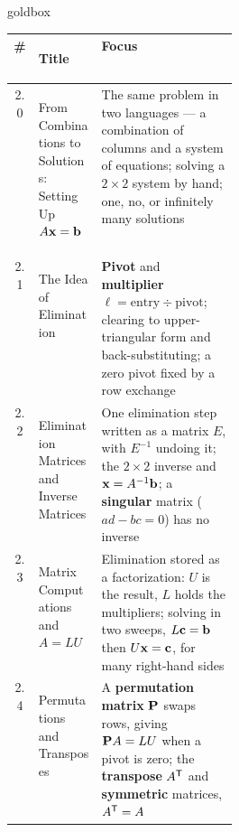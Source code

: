 \vspace{0.13in}

\renewcommand{\arraystretch}{1.32}
\begin{skillbox}{goldbox}
\begin{tabularx}{\linewidth}{@{} c >{\bfseries\raggedright\arraybackslash}p{0.29\linewidth} X @{}}
  \textbf{\#} & \textbf{Title} & \textbf{Focus} \\
  \hline
  2.0 & From Combinations to Solutions: Setting Up $A\mathbf{x}=\mathbf{b}$
    & The same problem in two languages --- a combination of columns and a system of
      equations; solving a $2\times 2$ system by hand; one, no, or infinitely many solutions \\
  \hline
  2.1 & The Idea of Elimination
    & \textbf{Pivot} and \textbf{multiplier} $\ell = \text{entry} \div \text{pivot}$; clearing
      to upper-triangular form and back-substituting; a zero pivot fixed by a row exchange \\
  \hline
  2.2 & Elimination Matrices and Inverse Matrices
    & One elimination step written as a matrix $E$, with $E^{-1}$ undoing it; the $2\times 2$
      inverse and $\mathbf{x} = A^{-1}\mathbf{b}$; a \textbf{singular} matrix ($ad-bc = 0$) has no inverse \\
  \hline
  2.3 & Matrix Computations and $A = LU$
    & Elimination stored as a factorization: $U$ is the result, $L$ holds the multipliers;
      solving in two sweeps, $L\mathbf{c}=\mathbf{b}$ then $U\mathbf{x}=\mathbf{c}$, for many right-hand sides \\
  \hline
  2.4 & Permutations and Transposes
    & A \textbf{permutation matrix} $\mathbf{P}$ swaps rows, giving $\mathbf{P} A = LU$ when a pivot is zero;
      the \textbf{transpose} $A^{\mathsf{T}}$ and \textbf{symmetric} matrices, $A^{\mathsf{T}} = A$ \\
  \hline
\end{tabularx}
\end{skillbox}

\vspace{0.11in}

